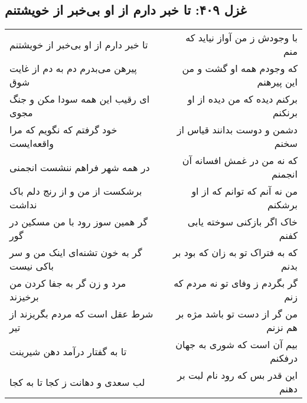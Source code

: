 \begin{center}
\section*{غزل ۴۰۹: تا خبر دارم از او بی‌خبر از خویشتنم}
\label{sec:409}
\begin{longtable}{l p{0.5cm} r}
تا خبر دارم از او بی‌خبر از خویشتنم
&&
با وجودش ز من آواز نیاید که منم
\\
پیرهن می‌بدرم دم به دم از غایت شوق
&&
که وجودم همه او گشت و من این پیرهنم
\\
ای رقیب این همه سودا مکن و جنگ مجوی
&&
برکنم دیده که من دیده از او برنکنم
\\
خود گرفتم که نگویم که مرا واقعه‌ایست
&&
دشمن و دوست بدانند قیاس از سخنم
\\
در همه شهر فراهم ننشست انجمنی
&&
که نه من در غمش افسانه آن انجمنم
\\
برشکست از من و از رنج دلم باک نداشت
&&
من نه آنم که توانم که از او برشکنم
\\
گر همین سوز رود با من مسکین در گور
&&
خاک اگر بازکنی سوخته یابی کفنم
\\
گر به خون تشنه‌ای اینک من و سر باکی نیست
&&
که به فتراک تو به زان که بود بر بدنم
\\
مرد و زن گر به جفا کردن من برخیزند
&&
گر بگردم ز وفای تو نه مردم که زنم
\\
شرط عقل است که مردم بگریزند از تیر
&&
من گر از دست تو باشد مژه بر هم نزنم
\\
تا به گفتار درآمد دهن شیرینت
&&
بیم آن است که شوری به جهان درفکنم
\\
لب سعدی و دهانت ز کجا تا به کجا
&&
این قدر بس که رود نام لبت بر دهنم
\\
\end{longtable}
\end{center}

